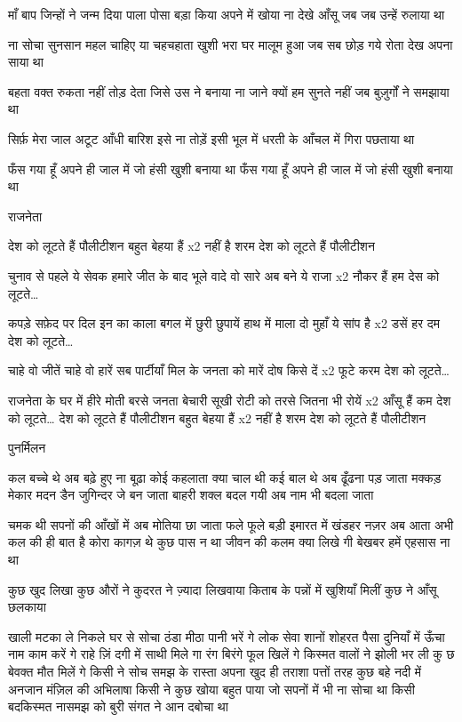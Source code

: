 माँ बाप जिन्हों ने जन्म दिया
पाला पोसा बड़ा किया
अपने में खोया ना देखे आँसू
जब जब उन्हें रुलाया था

ना सोचा सुनसान महल चाहिए
या चहचहाता खुशी भरा घर
मालूम हुआ जब सब छोड़ गये
रोता देख अपना साया था


बहता वक्त रुकता नहीं
तोड़ देता जिसे उस ने बनाया
ना जाने क्यों हम सुनते नहीं
जब बुज़ुर्गों ने समझाया था

सिर्फ़ मेरा जाल अटूट
आँधी बारिश इसे ना तोड़ें
इसी भूल में धरती के
आँचल में गिरा पछताया था


फँस गया हूँ अपने ही जाल में
जो हंसी खुशी बनाया था
फँस गया हूँ अपने ही जाल में
जो हंसी खुशी बनाया था

राजनेता

देश को लूटते हैं पौलीटीशन
बहुत बेहया हैं x2
नहीं है शरम
देश को लूटते हैं पौलीटीशन

चुनाव से पहले ये सेवक हमारे
जीत के बाद भूले वादे वो सारे
अब बने ये राजा x2
नौकर हैं हम
देस को लूटते…

कपड़े सफ़ेद पर दिल इन का काला
बगल में छुरी छुपायें हाथ में माला
दो मुहाँ ये सांप है x2
डसें हर दम
देश को लूटते…

चाहे वो जीतें चाहे वो हारें
सब पार्टीयाँ मिल के जनता को मारें
दोष किसे दें x2
फूटे करम
देश को लूटते…

राजनेता के घर में हीरे मोती बरसे
जनता बेचारी सूखी रोटी को तरसे
जितना भी रोयें x2
आँसू हैं कम
देश को लूटते…
देश को लूटते हैं पौलीटीशन
बहुत बेहया हैं x2
नहीं है शरम
देश को लूटते हैं पौलीटीशन



पुनर्मिलन

कल बच्चे थे अब बढ़े हुए
ना बूढ़ा कोई कहलाता
क्या चाल थी कई बाल थे
अब ढूँढना पड़ जाता
मक्कड़ मेकार मदन डैन
जुगिन्दर जे बन जाता
बाहरी शक्ल बदल गयी
अब नाम भी बदला जाता

चमक थी सपनों की आँखों में
अब मोतिया छा जाता
फले फूले बड़ी इमारत में
खंडहर नज़र अब आता
अभी कल की ही बात है
कोरा कागज़ थे कुछ पास न था
जीवन की कलम क्या लिखे गी
बेखबर हमें एहसास ना था

कुछ खुद लिखा कुछ औरों ने
कुदरत ने ज़्यादा लिखवाया
किताब के पन्नों में खुशियाँ मिलीं
कुछ ने आँसू छलकाया


खाली मटका ले निकले घर से
सोचा ठंडा मीठा पानी भरें गे
लोक सेवा शानों शोहरत पैसा
दुनियाँ में ऊँचा नाम काम करें गे
राहे ज़िं दगी में साथी मिले गा
रंग बिरंगे फूल खिलें गे
किस्मत वालों ने झोली भर ली
कु छ बेवक्त मौत मिलें गे
किसी ने सोच समझ के
रास्ता अपना खुद ही तराशा
पत्तों तरह कुछ बहे नदी में
अनजान मंज़िल की अभिलाषा
किसी ने कुछ खोया बहुत पाया
जो सपनों में भी ना सोचा था
किसी बदकिस्मत नासमझ को
बुरी संगत ने आन दबोचा था

